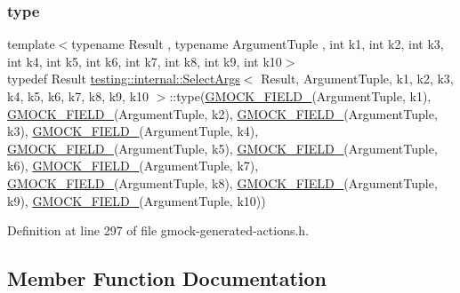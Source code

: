 \subsubsection{\texorpdfstring{type}{type}}
{\footnotesize\ttfamily template$<$typename Result , typename Argument\+Tuple , int k1, int k2, int k3, int k4, int k5, int k6, int k7, int k8, int k9, int k10$>$ \\
typedef Result \hyperlink{classtesting_1_1internal_1_1SelectArgs}{testing\+::internal\+::\+Select\+Args}$<$ Result, Argument\+Tuple, k1, k2, k3, k4, k5, k6, k7, k8, k9, k10 $>$\+::type(\hyperlink{gmock-generated-actions_8h_a6eb3ce92b0613603057a20ec9e593317}{G\+M\+O\+C\+K\+\_\+\+F\+I\+E\+L\+D\+\_\+}(Argument\+Tuple, k1), \hyperlink{gmock-generated-actions_8h_a6eb3ce92b0613603057a20ec9e593317}{G\+M\+O\+C\+K\+\_\+\+F\+I\+E\+L\+D\+\_\+}(Argument\+Tuple, k2), \hyperlink{gmock-generated-actions_8h_a6eb3ce92b0613603057a20ec9e593317}{G\+M\+O\+C\+K\+\_\+\+F\+I\+E\+L\+D\+\_\+}(Argument\+Tuple, k3), \hyperlink{gmock-generated-actions_8h_a6eb3ce92b0613603057a20ec9e593317}{G\+M\+O\+C\+K\+\_\+\+F\+I\+E\+L\+D\+\_\+}(Argument\+Tuple, k4), \hyperlink{gmock-generated-actions_8h_a6eb3ce92b0613603057a20ec9e593317}{G\+M\+O\+C\+K\+\_\+\+F\+I\+E\+L\+D\+\_\+}(Argument\+Tuple, k5), \hyperlink{gmock-generated-actions_8h_a6eb3ce92b0613603057a20ec9e593317}{G\+M\+O\+C\+K\+\_\+\+F\+I\+E\+L\+D\+\_\+}(Argument\+Tuple, k6), \hyperlink{gmock-generated-actions_8h_a6eb3ce92b0613603057a20ec9e593317}{G\+M\+O\+C\+K\+\_\+\+F\+I\+E\+L\+D\+\_\+}(Argument\+Tuple, k7), \hyperlink{gmock-generated-actions_8h_a6eb3ce92b0613603057a20ec9e593317}{G\+M\+O\+C\+K\+\_\+\+F\+I\+E\+L\+D\+\_\+}(Argument\+Tuple, k8), \hyperlink{gmock-generated-actions_8h_a6eb3ce92b0613603057a20ec9e593317}{G\+M\+O\+C\+K\+\_\+\+F\+I\+E\+L\+D\+\_\+}(Argument\+Tuple, k9), \hyperlink{gmock-generated-actions_8h_a6eb3ce92b0613603057a20ec9e593317}{G\+M\+O\+C\+K\+\_\+\+F\+I\+E\+L\+D\+\_\+}(Argument\+Tuple, k10))}



Definition at line 297 of file gmock-\/generated-\/actions.\+h.



\subsection{Member Function Documentation}
\mbox{\label{classtesting_1_1internal_1_1SelectArgs_a372c597a96263b29d59fdb08183bc2e1}} 

